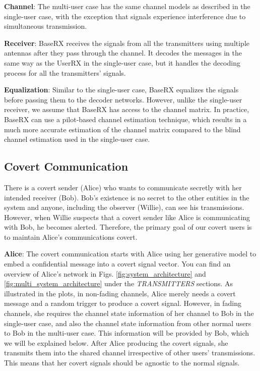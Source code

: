 \textbf{Channel}: The multi-user case has the same channel models as described in the single-user case, with the exception that signals experience interference due to simultaneous transmission.

\textbf{Receiver}: BaseRX receives the signals from all the transmitters using multiple antennas after they pass through the channel. It decodes the messages in the same way as the UserRX in the single-user case, but it handles the decoding process for all the transmitters' signals.

\textbf{Equalization}: Similar to the single-user case, BaseRX equalizes the signals before passing them to the decoder networks. However, unlike the single-user receiver, we assume that BaseRX has access to the channel matrix. In practice, BaseRX can use a pilot-based channel estimation technique, which results in a much more accurate estimation of the channel matrix compared to the blind channel estimation used in the single-user case.

\subsection{Covert Communication}
There is a covert sender (Alice) who wants to communicate secretly with her intended receiver (Bob). Bob's existence is no secret to the other entities in the system and anyone, including the observer (Willie), can see his transmissions. However, when Willie suspects that a covert sender like Alice is communicating with Bob, he becomes alerted. Therefore, the primary goal of our covert users is to maintain Alice's communications covert.

\textbf{Alice}: The covert communication starts with Alice using her generative model to embed a confidential message into a covert signal vector. You can find an overview of Alice's network in Figs. \ref{fig:system_architecture} and \ref{fig:multi_system_architecture} under the \textit{TRANSMITTERS} sections. As illustrated in the plots, in non-fading channels, Alice merely needs a covert message and a random trigger to produce a covert signal. However, in fading channels, she requires the channel state information of her channel to Bob in the single-user case, and also the channel state information from other normal users to Bob in the multi-user case. This information will be provided by Bob, which we will be explained below. After Alice producing the covert signals, she transmits them into the shared channel irrespective of other users' transmissions. This means that her covert signals should be agnostic to the normal signals.

